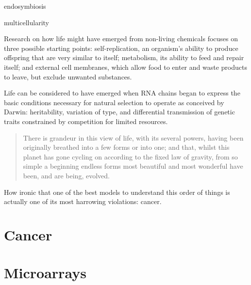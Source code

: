\documentclass{tufte-book}
\begin{document}
endosymbiosis

multicellularity

Research on how life might have emerged from non-living chemicals focuses on
three possible starting points: self-replication, an organism's ability to
produce offspring that are very similar to itself; metabolism, its ability to
feed and repair itself; and external cell membranes, which allow food to enter
and waste products to leave, but exclude unwanted substances.


Life can be considered to have emerged when RNA chains began to express the
basic conditions necessary for natural selection to operate as conceived by
Darwin: heritability, variation of type, and differential transmission of
genetic traits constrained by competition for limited resources.

\begin{quotation}
  There is grandeur in this view of life, with its several powers, having been
  originally breathed into a few forms or into one; and that, whilst this planet
  has gone cycling on according to the fixed law of gravity, from so simple a
  beginning endless forms most beautiful and most wonderful have been, and are
  being, evolved.
\end{quotation}

How ironic that one of the best models to understand this order of things is
actually one of its most harrowing violations: cancer.\bigskip

\section{Cancer}

\bigskip

\section{Microarrays}

\backmatter



% 
% 
\end{document}
